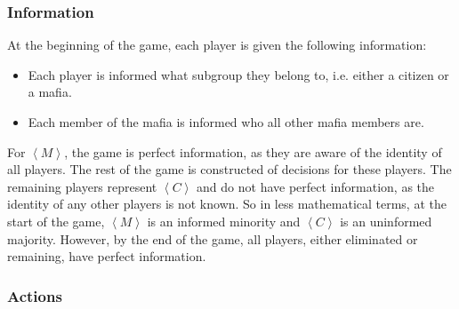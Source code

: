 \documentclass[12pt]{article}
\begin{document}
\subsubsection{Information}
At the beginning of the game, each player is given the following information:
\begin{itemize}
	\item Each player is informed what subgroup they belong to, i.e. either a citizen or a mafia.
	\item Each member of the mafia is informed who all other mafia members are.
\end{itemize}

For $\left<M\right>$, the game is perfect information, as they are aware of the identity of all players. The rest of the game is constructed of decisions for these players. The remaining players represent $\left<C\right>$ and do not have perfect information, as the identity of any other players is not known. So in less mathematical terms, at the start of the game, $\left<M\right>$ is an informed minority and $\left<C\right>$ is an uninformed majority. However, by the end of the game, all players, either eliminated or remaining, have perfect information.

\subsubsection{Actions}

\begin{center}
\end{center}
\end{document}
